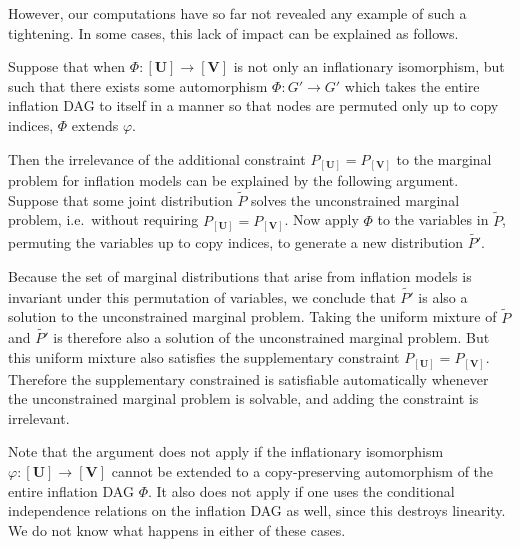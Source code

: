 However, our computations have so far not revealed any example of such a tightening. In some cases, this lack of impact can be explained as follows.

Suppose that when $\Phi:[\bm{U}]\to[\bm{V}]$ is not only an inflationary isomorphism, but such that there exists some automorphism $\Phi:G'\to G'$ which takes the entire inflation DAG to itself in a manner so that nodes are permuted only up to copy indices,  $\Phi$ extends $\varphi$. 


Then the irrelevance of the additional constraint $P_{[\bm{U}]} = P_{[\bm{V}]}$ to the marginal problem for inflation models can be explained by the following argument. Suppose that some joint distribution $\tilde{P}$ solves the unconstrained marginal problem, i.e.~without requiring $P_{[\bm{U}]} = P_{[\bm{V}]}$. Now apply $\Phi$ to the variables in $\tilde{P}$, permuting the variables up to copy indices, to generate a new distribution $\tilde{P'}$. 

Because the set of marginal distributions that arise from inflation models is invariant under this permutation of variables, we conclude that $\tilde{P'}$ is also a solution to the unconstrained marginal problem. Taking the uniform mixture of $\tilde{P}$ and $\tilde{P'}$ is therefore also a solution of the unconstrained marginal problem. But this uniform mixture also satisfies the supplementary constraint $P_{[\bm{U}]} = P_{[\bm{V}]}$. Therefore the supplementary constrained is satisfiable automatically whenever the unconstrained marginal problem is solvable, and adding the constraint is irrelevant.

Note that the argument does not apply if the inflationary isomorphism $\varphi:[\bm{U}]\to[\bm{V}]$ cannot be extended to a copy-preserving automorphism of the entire inflation DAG $\Phi$. It also does not apply if one uses the conditional independence relations on the inflation DAG as well, since this destroys linearity. We do not know what happens in either of these cases.

